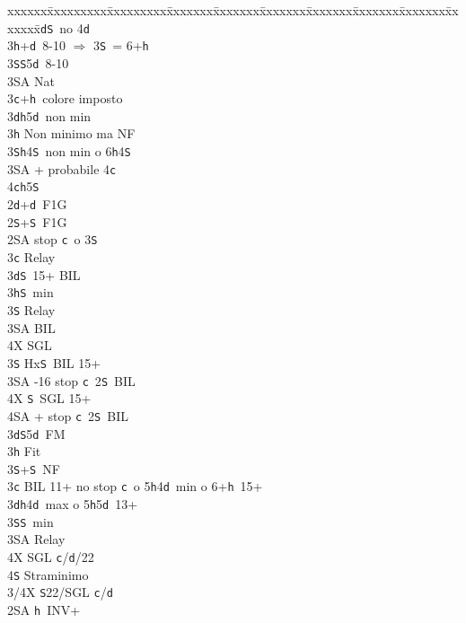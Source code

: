 \documentclass[a4paper,italian]{article}
\newcommand{\BS}{\small{\texttt{S}}}
\newcommand{\BC}{\small{\texttt{c}}}
\newcommand{\BD}{\small{\texttt{d}}}
\newcommand{\BH}{\small{\texttt{h}}}
\newenvironment{bidtable}
{\begin{tabbing}

    xxxxxx\=xxxxxxxxx\=xxxxxxxxx\=xxxxxxx\=xxxxxxx\=xxxxxxx\=xxxxxxx\=xxxxxxx\=xxxxxxx\=xxxxxxx\=\kill}
{\end{tabbing} }%
\begin{document}
\begin{multicols}{2}
\begin{bidtable}
        3\BD {}\BS\ no 4\BD \\
        3\BH {}+\BD\ 8-10 $\Rightarrow$ 3\BS\ = 6+\BH\\
        3\BS {}\BS 5\BD\ 8-10\\
        3\small{SA} \> Nat\-\\
        3\BC {}+\BH\ colore imposto\\
        3\BD {}\BH 5\BD\ non min\\
        3\BH \> Non minimo ma NF\\
        3\BS {}\BH 4\BS\ non min o 6\BH 4\BS \\
        3\small{SA} + probabile 4\BC \\
        4\BC {}\BH 5\BS \-\\
        2\BD {}+\BD\ F1G\\
        2\BS {}+\BS\ F1G\+\\
        2\small{SA}  stop \BC\ o 3\BS \+\\
        3\BC \> Relay\+\\
        3\BD {}\BS\ 15+ BIL\\
        3\BH {}\BS\ min\+\\
        3\BS \> Relay\+\\
        3\small{SA} \> BIL\\
        4X \> SGL\-\-\\
        3\BS \> Hx\BS\ BIL 15+\\
        3\small{SA} -16 stop \BC\ 2\BS\ BIL\\
        4X \BS\ SGL 15+\\
        4\small{SA} + stop \BC\ 2\BS\ BIL\-\\
        3\BD {}\BS 5\BD\ FM\\
        3\BH \> Fit\\
        3\BS {}+\BS\ NF\-\\
        3\BC \> BIL 11+ no stop \BC\ o 5\BH 4\BD\ min o 6+\BH\ 15+\\
        3\BD {}\BH 4\BD\ max o 5\BH 5\BD\ 13+\\
        3\BS {}\BS\ min\+\\
        3\small{SA} \> Relay\+\\
        4X \> SGL \BC /\BD /22\\
        4\BS \> Straminimo\-\-\\
        3/4X \BS 22/SGL \BC /\BD \-\\
        2\small{SA} \BH\ INV+\+\\

\end{bidtable}
\end{multicols}
\end{document}
